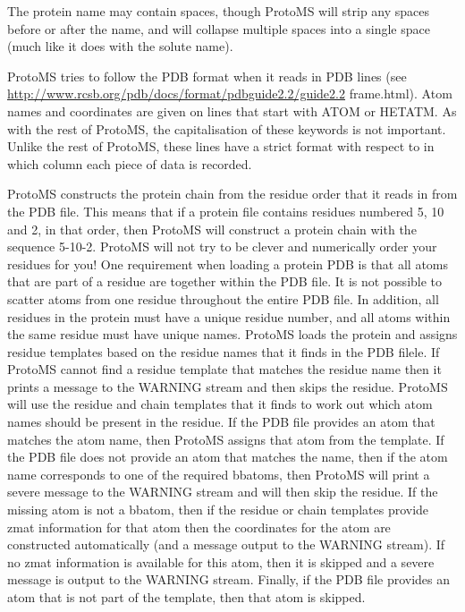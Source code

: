 \documentclass[letterpaper,10pt,english]{manual}
\begin{document}
The protein name may contain spaces, though ProtoMS will strip any spaces before or after the name, and will collapse multiple spaces into a single space (much like it does with the solute name).

ProtoMS tries to follow the PDB format when it reads in PDB lines (see \href{http://www.rcsb.org/pdb/docs/format/pdbguide2.2/guide2.2}{http://www.rcsb.org/pdb/docs/format/pdbguide2.2/guide2.2} frame.html). Atom names and coordinates are given on lines that start with ATOM or HETATM. As with the rest of ProtoMS, the capitalisation of these keywords is not important. Unlike the rest of ProtoMS, these lines have a strict format with respect to in which column each piece of data is recorded.

ProtoMS constructs the protein chain from the residue order that it reads in from the PDB file. This means that if a protein file contains residues numbered 5, 10 and 2, in that order, then ProtoMS will construct a protein chain with the sequence 5-10-2. ProtoMS will not try to be clever and numerically order your residues for you! One requirement when loading a protein PDB is that all atoms that are part of a residue are together within the PDB file. It is not possible to scatter atoms from one residue throughout the entire PDB file. In addition, all residues in the protein must have a unique residue number, and all atoms within the same residue must have unique names. ProtoMS loads the protein and assigns residue templates based on the residue names that it finds in the PDB filele. If ProtoMS cannot find a residue template that matches the residue name then it prints a message to the WARNING stream and then skips the residue. ProtoMS will use the residue and chain templates that it finds to work out which atom names should be present in the residue. If the PDB file provides an atom that matches the atom name, then ProtoMS assigns that atom from the template. If the PDB file does not provide an atom that matches the name, then if the atom name corresponds to one of the required bbatoms, then ProtoMS will print a severe message to the WARNING stream and will then skip the residue. If the missing atom is not a bbatom, then if the residue or chain templates provide zmat information for that atom then the coordinates for the atom are constructed automatically (and a message output to the WARNING stream). If no zmat information is available for this atom, then it is skipped and a severe message is output to the WARNING stream. Finally, if the PDB file provides an atom that is not part of the template, then that atom is skipped.
\end{document}
